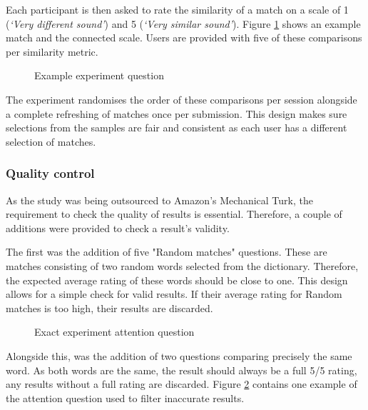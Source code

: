 Each participant is then asked to rate the similarity of a match on a scale of 1 (\textit{`Very different sound'}) and 5 (\textit{`Very similar sound'}). Figure \ref{fig:phoneticMatch} shows an example match and the connected scale. Users are provided with five of these comparisons per similarity metric.

\begin{figure}[h!]
    \centering
    \caption{Example experiment question}
    \label{fig:phoneticMatch}
\end{figure}

The experiment randomises the order of these comparisons per session alongside a complete refreshing of matches once per submission. This design makes sure selections from the samples are fair and consistent as each user has a different selection of matches.

\subsubsection{Quality control}
\label{sec:exp1_qualitycontrol}
As the study was being outsourced to Amazon's Mechanical Turk, the requirement to check the quality of results is essential. Therefore, a couple of additions were provided to check a result's validity.

The first was the addition of five "Random matches" questions. These are matches consisting of two random words selected from the dictionary. Therefore, the expected average rating of these words should be close to one. This design allows for a simple check for valid results. If their average rating for Random matches is too high, their results are discarded.

\begin{figure}[h!]
    \centering
    \caption{Exact experiment attention question}
    \label{fig:exactMatch}
\end{figure}

Alongside this, was the addition of two questions comparing precisely the same word. As both words are the same, the result should always be a full 5/5 rating, any results without a full rating are discarded. Figure \ref{fig:exactMatch} contains one example of the attention question used to filter inaccurate results.

